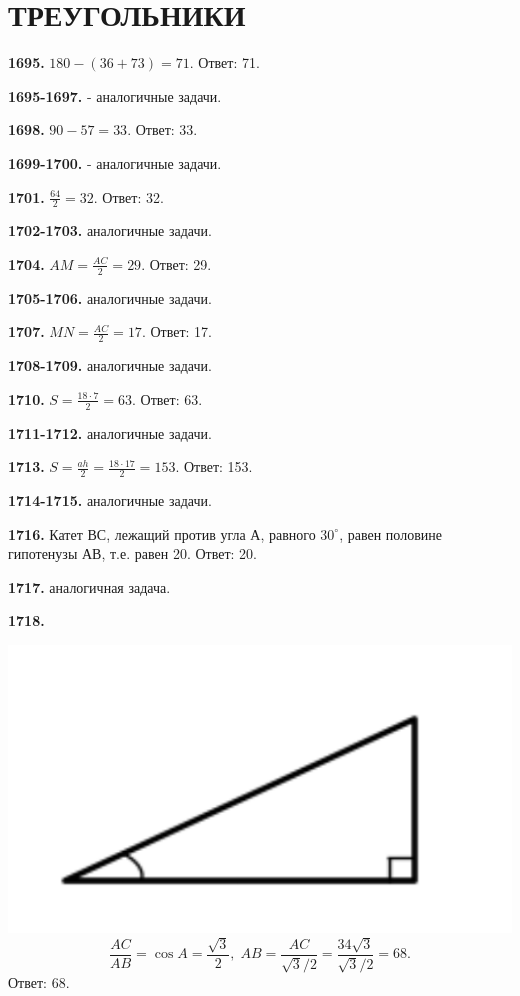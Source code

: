 \section{ТРЕУГОЛЬНИКИ}

\textbf{1695.}  $180-(36+73)=71.$  \newline \null \hfill  Ответ: 71.

\textbf{1695-1697.}  - аналогичные задачи. 

\textbf{1698.} $90-57=33.$ \newline \null \hfill Ответ: 33. 

\textbf{1699-1700.}  - аналогичные задачи. 

\textbf{1701.} $\frac{64}{2} = 32.$ \newline \null \hfill Ответ: 32.

\textbf{1702-1703.} аналогичные задачи.

\textbf{1704.} $AM = \frac{AC}{2} = 29$. \newline \null \hfill Ответ: 29.

\textbf{1705-1706.} аналогичные задачи.

\textbf{1707.} $MN = \frac{AC}{2} = 17.$ \newline \null \hfill Ответ: 17.

\textbf{1708-1709.} аналогичные задачи.

\textbf{1710.} $S = \frac{18 \cdot 7}{2} = 63$. \newline \null \hfill Ответ: 63.

\textbf{1711-1712.} аналогичные задачи.

\textbf{1713.} $S = \frac{ah}{2} = \frac{18 \cdot 17}{2} = 153$. \newline \null \hfill Ответ: 153.

\textbf{1714-1715.} аналогичные задачи.

\textbf{1716.} Катет $ВС$, лежащий против угла $А$, равного $30^\circ$, равен половине гипотенузы $АВ$, т.е. равен 20. 
\newline \null \hspace*{\fill} Ответ: 20.

\textbf{1717.} аналогичная задача.

\clearpage

\textbf{1718.} 

{\centering \includegraphics[width=0.4\linewidth]{Geometry/Content/1.png}
\[
\frac{AC}{AB} = \cos{A} = \frac{\sqrt{3}}{2}, \; AB = \frac{AC}{\sqrt{3} / 2} = \frac{34 \sqrt{3}}{\sqrt{3} / 2} = 68.
\]
\newline \null \hspace*{\fill} Ответ: 68.
}

